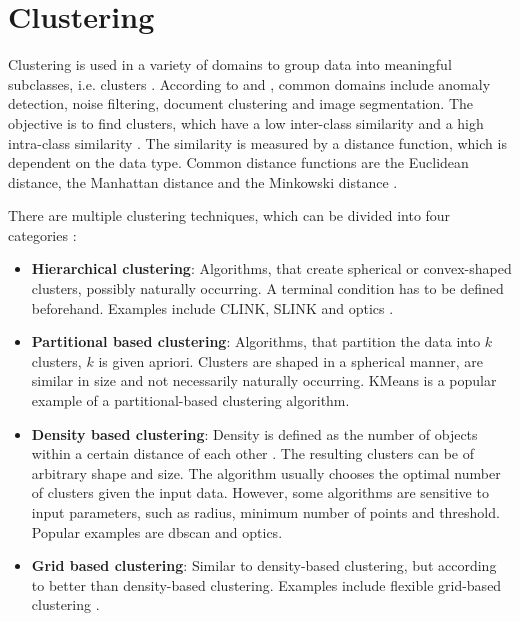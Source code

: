 
\section{Clustering}\label{sec:clustering}

Clustering is used in a variety of domains to group data into meaningful subclasses, i.e. clusters \cite{OPTICS2013, OPTICS2014, OPTICS_kMeans_2016}.
According to \citeauthor{OPTICS2013} and \citeauthor{clusteringDocs2020}, common domains include anomaly detection, noise filtering, document clustering and image segmentation. 
The objective is to find clusters, which have a low inter-class similarity and a high intra-class similarity \cite{OPTICS2013}.
The similarity is measured by a distance function, which is dependent on the data type. 
Common distance functions are the Euclidean distance, the Manhattan distance and the Minkowski distance \cite{OPTICS_kMeans_2016}.

There are multiple clustering techniques, which can be divided into four categories \cite{OPTICS2016}: 
\begin{itemize}
    \item \textbf{Hierarchical clustering}:
    Algorithms, that create spherical or convex-shaped clusters, possibly naturally occurring. 
    A terminal condition has to be defined beforehand.
    Examples include CLINK, SLINK \cite{OPTICS2014} and \ac{optics} \cite{OPTICS2013}.

    \item \textbf{Partitional based clustering}: 
    Algorithms, that partition the data into $k$ clusters, $k$ is given apriori.
    Clusters are shaped in a spherical manner, are similar in size and not necessarily naturally occurring.
    KMeans is a popular example of a partitional-based clustering algorithm.

    \item \textbf{Density based clustering}:
    Density is defined as the number of objects within a certain distance of each other \cite{OPTICS_kMeans_2016}.
    The resulting clusters can be of arbitrary shape and size.
    The algorithm usually chooses the optimal number of clusters given the input data.
    However, some algorithms are sensitive to input parameters, such as radius, minimum number of points and threshold.
    Popular examples are \ac{dbscan} and \ac{optics}.
    
    \item \textbf{Grid based clustering}:
    Similar to density-based clustering, but according to \citeauthor{OPTICS2016} better than density-based clustering.
    Examples include flexible grid-based clustering \cite{OPTICS2014}.
    
\end{itemize}

